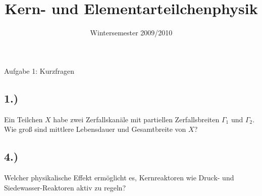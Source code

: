 

\subject{KET}
\title{Kern- und Elementarteilchenphysik}
\date{
    Wintersemester 2009/2010
}



\maketitle
\thispagestyle{empty}
\newpage


\begin{aufgabe}{Aufgabe 1: Kurzfragen}
    \subsection{1.)}
    Ein Teilchen $X$ habe zwei Zerfallskanäle mit partiellen Zerfallsbreiten $\Gamma_1$ und $\Gamma_2$.
    Wie groß sind mittlere Lebensdauer und Gesamtbreite von $X$?





    \subsection{4.)}
    Welcher physikalische Effekt ermöglicht es, Kernreaktoren wie Druck- und Siedewasser-Reaktoren aktiv zu regeln?


\end{aufgabe}
